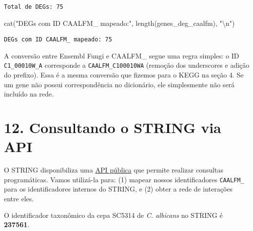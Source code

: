 \documentclass[
  letterpaper,
  DIV=11,
  numbers=noendperiod]{scrreprt}
\newenvironment{Shaded}{\begin{snugshade}}{\end{snugshade}}
\newcommand{\FunctionTok}[1]{\textcolor[rgb]{0.28,0.35,0.67}{#1}}
\newcommand{\NormalTok}[1]{\textcolor[rgb]{0.00,0.23,0.31}{#1}}
\newcommand{\SpecialCharTok}[1]{\textcolor[rgb]{0.37,0.37,0.37}{#1}}
\newcommand{\StringTok}[1]{\textcolor[rgb]{0.13,0.47,0.30}{#1}}
\begin{document}
\begin{verbatim}
Total de DEGs: 75 
\end{verbatim}

\begin{Shaded}
\begin{Highlighting}[]
\FunctionTok{cat}\NormalTok{(}\StringTok{"DEGs com ID CAALFM\_ mapeado:"}\NormalTok{, }\FunctionTok{length}\NormalTok{(genes\_deg\_caalfm), }\StringTok{"}\SpecialCharTok{\textbackslash{}n}\StringTok{"}\NormalTok{)}
\end{Highlighting}
\end{Shaded}

\begin{verbatim}
DEGs com ID CAALFM_ mapeado: 75 
\end{verbatim}

\begin{tcolorbox}[enhanced jigsaw, arc=.35mm, colframe=quarto-callout-note-color-frame, breakable, bottomrule=.15mm, colback=white, left=2mm, titlerule=0mm, opacityback=0, title=\textcolor{quarto-callout-note-color}{\faInfo}\hspace{0.5em}{Ponto Importante --- Conversão de Identificadores}, leftrule=.75mm, colbacktitle=quarto-callout-note-color!10!white, bottomtitle=1mm, toprule=.15mm, toptitle=1mm, rightrule=.15mm, opacitybacktitle=0.6, coltitle=black]

A conversão entre Ensembl Fungi e CAALFM\_ segue uma regra simples: o ID
\texttt{C1\_00010W\_A} corresponde a \texttt{CAALFM\_C100010WA} (remoção
dos underscores e adição do prefixo). Essa é a mesma conversão que
fizemos para o KEGG na seção 4. Se um gene não possui correspondência no
dicionário, ele simplesmente não será incluído na rede.

\end{tcolorbox}

\section{12. Consultando o STRING via
API}\label{consultando-o-string-via-api}

O STRING disponibiliza uma \href{https://string-db.org/help/api/}{API
pública} que permite realizar consultas programáticas. Vamos utilizá-la
para: (1) mapear nossos identificadores \texttt{CAALFM\_} para os
identificadores internos do STRING, e (2) obter a rede de interações
entre eles.

O identificador taxonômico da cepa SC5314 de \emph{C. albicans} no
STRING é \textbf{237561}.
\end{document}
